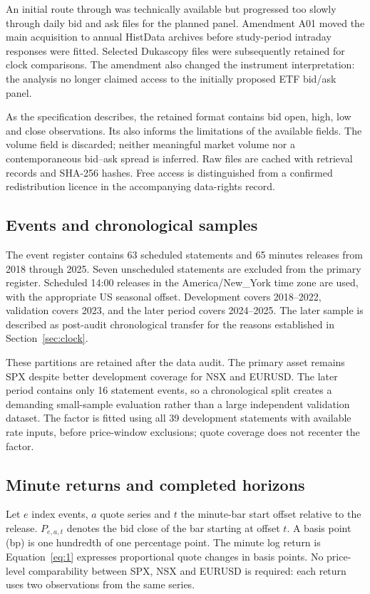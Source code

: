 
An initial route through  was technically available but progressed too slowly through daily bid and ask files for the planned panel. Amendment A01 moved the main acquisition to annual HistData archives before study-period intraday responses were fitted. Selected Dukascopy files were subsequently retained for clock comparisons. The amendment also changed the instrument interpretation: the analysis no longer claimed access to the initially proposed ETF bid/ask panel.

As the  specification describes, the retained format contains bid open, high, low and close observations. Its  also informs the limitations of the available fields. The volume field is discarded; neither meaningful market volume nor a contemporaneous bid--ask spread is inferred. Raw files are cached with retrieval records and SHA-256 hashes. Free access is distinguished from a confirmed redistribution licence in the accompanying data-rights record.

\subsection{Events and chronological samples}
The event register contains 63 scheduled statements and 65 minutes releases from 2018 through 2025. Seven unscheduled statements are excluded from the primary register. Scheduled 14:00 releases in the America/New\_York time zone are used, with the appropriate US seasonal offset. Development covers 2018--2022, validation covers 2023, and the later period covers 2024--2025. The later sample is described as post-audit chronological transfer for the reasons established in Section~\ref{sec:clock}.


These partitions are retained after the data audit. The primary asset remains SPX despite better development coverage for NSX and EURUSD. The later period contains only 16 statement events, so a chronological split creates a demanding small-sample evaluation rather than a large independent validation dataset. The factor is fitted using all 39 development statements with available rate inputs, before price-window exclusions; quote coverage does not recenter the factor.

\subsection{Minute returns and completed horizons}
Let $e$ index events, $a$ quote series and $t$ the minute-bar start offset relative to the release. $P_{e,a,t}$ denotes the bid close of the bar starting at offset $t$. A basis point (bp) is one hundredth of one percentage point. The minute log return is
Equation~\ref{eq:1} expresses proportional quote changes in basis points. No price-level comparability between SPX, NSX and EURUSD is required: each return uses two observations from the same series.

